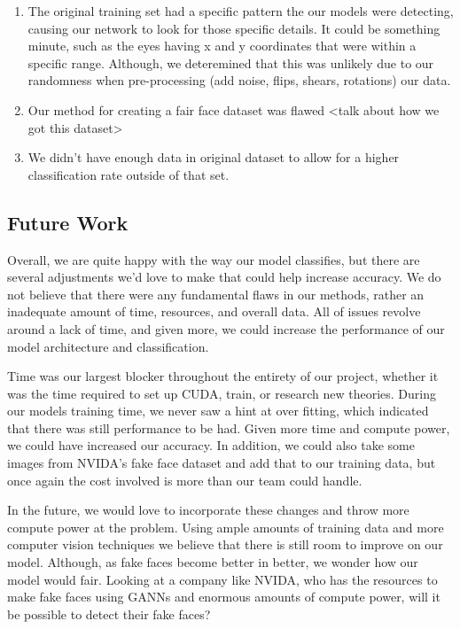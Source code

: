 \documentclass[11pt, letterpaper]{article}
\begin{document}
\begin{multicols}{2}
	\begin{enumerate}
  		\item The original training set had a specific pattern the our models were detecting, causing our network to look for those specific details. It could be something minute, such as the eyes having x and y coordinates that were within a specific range. Although, we deteremined that this was unlikely due to our randomness when pre-processing (add noise, flips, shears, rotations) our data. 
  		\item Our method for creating a fair face dataset was flawed <talk about how we got this dataset>
  		\item We didn't have enough data in original dataset to allow for a higher classification rate outside of that set. 
	\end{enumerate}
	
  \subsection{Future Work}
  Overall, we are quite happy with the way our model classifies, but there are several adjustments we'd love to make that could help increase accuracy. We do not believe that there were any fundamental flaws in our methods, rather an inadequate amount of time, resources, and overall data. All of issues revolve around a lack of time, and given more, we could increase the performance of our model architecture and classification. 
  
  Time was our largest blocker throughout the entirety of our project, whether it was the time required to set up CUDA, train, or research new theories. During our models training time, we never saw a hint at over fitting, which indicated that there was still performance to be had. Given more time and compute power, we could have increased our accuracy. In addition, we could also take some images from NVIDA's fake face dataset and add that to our training data, but once again the cost involved is more than our team could handle. 
  
  In the future, we would love to incorporate these changes and throw more compute power at the problem. Using ample amounts of training data and more computer vision techniques we believe that there is still room to improve on our model. Although, as fake faces become better in better, we wonder how our model would fair. Looking at a company like NVIDA, who has the resources to make fake faces using GANNs and enormous amounts of compute power, will it be possible to detect their fake faces? 
  
\end{multicols}



\end{document}
